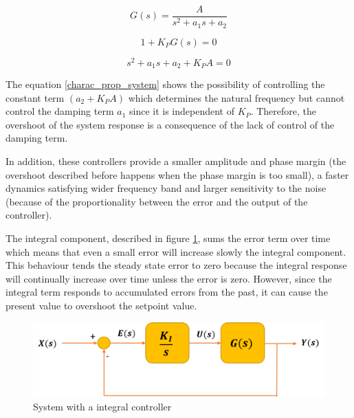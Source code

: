 \begin{equation}\label{system_equation}
G(s)= \frac{A}{s^2 + a_{1}s + a_{2}}
\end{equation}

\begin{equation}\label{charac_equation1}
1 + K_PG(s)=0
\end{equation}

\begin{equation}\label{charac_prop_system}
s^2 + a_{1}s + a_{2} + K_PA=0
\end{equation}

The equation \ref{charac_prop_system} shows the possibility of controlling the constant term $(a_{2} + K_PA)$ which determines the natural frequency but cannot control the damping term $a_{1}$ since it is independent of $K_{P}$. Therefore, the overshoot of the system response is a consequence of the lack of control of the damping term.

In addition, these controllers provide a smaller amplitude and phase margin (the overshoot described before happens when the phase margin is too small), a faster dynamics satisfying wider frequency band and larger sensitivity to the noise (because of the proportionality between the error and the output of the controller).

\vspace{5mm}

The integral component, described in figure \ref{integ_controller}, sums the error term over time which means that even a small error will increase slowly the integral component. This behaviour tends the steady state error to zero because the integral response will continually increase over time unless the error is zero. However, since the integral term responds to accumulated errors from the past, it can cause the present value to overshoot the setpoint value.

\begin{figure}[H]
	\centering
	\includegraphics[scale=0.6]{figures/integ_controller.png}
	\caption{System with a integral controller}
	\label{integ_controller}
\end{figure}

